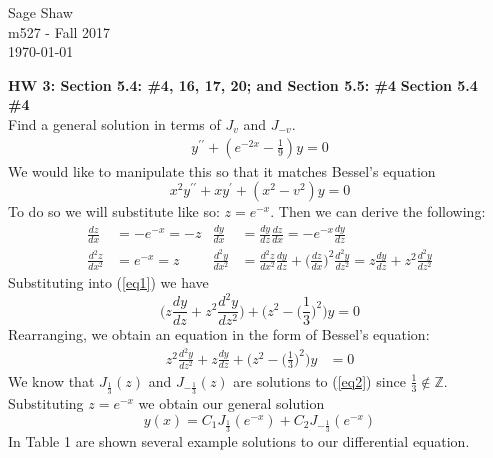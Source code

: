 \documentclass[12pt]{article}
\newcommand{\problem}[1]{\hspace{-4 ex} \large \textbf{#1}\\}
\begin{document}
	\thispagestyle{empty}
	
	\begin{flushright}
		Sage Shaw \\
		m527 - Fall 2017 \\
		\today
	\end{flushright}
	
{\large \textbf{HW 3: Section 5.4: \#4, 16, 17, 20; and Section 5.5: \#4 }}\bigbreak
\large{\textbf{Section 5.4}}\\
\problem{\#4} Find a general solution in terms of $J_v$ and $J_{-v}$.
\begin{align}\label{eq1}
y^{\prime\prime} + (e^{-2x}-\frac{1}{9})y = 0
\end{align}
	We would like to manipulate this so that it matches Bessel's equation
	$$
	x^2y^{\prime\prime} + xy^\prime +(x^2-v^2)y = 0
	$$
	To do so we will substitute like so: $z=e^{-x}$. Then we can derive the following:
	\begin{align*}
		\frac{dz}{dx} & = -e^{-x} = -z &  \frac{dy}{dx} & = \frac{dy}{dz}\frac{dz}{dx}= -e^{-x}\frac{dy}{dz}\\
		\frac{d^2z}{dx^2} & = e^{-x} = z & \frac{d^2y}{dx^2} & = \frac{d^2z}{dx^2}\frac{dy}{dz} + \Big(\frac{dz}{dx}\Big)^2\frac{d^2y}{dz^2}= z\frac{dy}{dz} + z^2\frac{d^2y}{dz^2}
	\end{align*}
	Substituting into (\ref{eq1}) we have
	$$
	\Big(z\frac{dy}{dz} + z^2\frac{d^2y}{dz^2}\Big) + \Big(z^2 - \Big(\frac{1}{3}\Big)^2\Big)y = 0
	$$
	Rearranging, we obtain an equation in the form of Bessel's equation:
	\begin{align}\label{eq2}
		z^2\frac{d^2y}{dz^2} + z\frac{dy}{dz} + \Big(z^2 - \Big(\frac{1}{3}\Big)^2\Big)y & = 0
	\end{align}
	We know that $J_{\frac{1}{3}}(z)$ and $J_{-\frac{1}{3}}(z)$ are solutions to (\ref{eq2}) since $\frac{1}{3} \notin \mathbb{Z}$. Substituting $z=e^{-x}$ we obtain our general solution
	$$
	y(x) = C_1J_{\frac{1}{3}}(e^{-x}) + C_2J_{-\frac{1}{3}}(e^{-x})
	$$
	In Table 1 are shown several example solutions to our differential equation.
\end{document}
